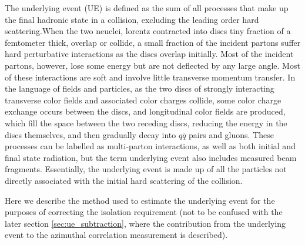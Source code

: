 The underlying event (UE) is defined as the sum of all processes that make up the final hadronic state in a collision, excluding the leading order hard scattering.When the two neuclei, lorentz contracted into discs tiny fraction of a femtometer thick, overlap or collide, a small fraction of the incident partons suffer hard perturbative interactions as the discs overlap initially. Most of the incident partons, however, lose some energy but are not deflected by any large angle. Most of these interactions are soft and involve little transverse momentum transfer. In the language of fields and particles, as the two discs of strongly interacting transverse color fields and associated color charges collide, some color charge exchange occurs between the discs, and longitudinal color fields are produced, which fill the space between the two receding discs, reducing the energy in the discs themselves, and then gradually decay into $q\bar{q}$ pairs and gluons. These processes can be labelled as multi-parton interactions, as well as both initial and final state radiation, but the term underlying event also includes measured beam fragments. Essentially, the underlying event is made up of all the particles not directly associated with the initial hard scattering of the collision.

Here we describe the method used to estimate the underlying event for the purposes of correcting the isolation requirement (not to be confused with the later section \ref{sec:ue_subtraction}, where the contribution from the underlying event to the azimuthal correlation measurement is described).

